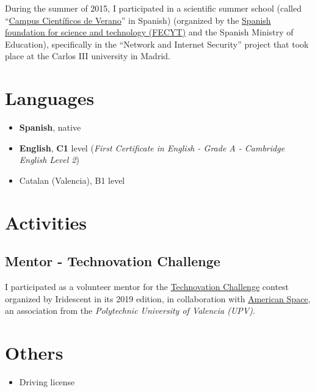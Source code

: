 \documentclass[letterpaper, 12pt, dvipsnames]{article}
\newcommand{\uni}{{\uniFull} ({\uniShort})}
\newcommand{\uniFull}{Polytechnic University of Valencia}
\newcommand{\uniShort}{UPV}
\newcommand{\fce}{\emph{First Certificate in English - Grade A - Cambridge English Level 2}}
\begin{document}
During the summer of 2015, I participated in a scientific summer school (called ``\href{https://www.fecyt.es/en/tematica/campus-cientificos-de-verano}{Campus Científicos de Verano}'' in Spanish) (organized by the \href{https://www.fecyt.es/en}{Spanish foundation for science and technology (FECYT)} and the Spanish Ministry of Education), specifically in the ``Network and Internet Security'' project that took place at the Carlos III university in Madrid.

\section*{Languages}

\begin{itemize}
    \item \textbf{Spanish}, native
    \item \textbf{English}, \textbf{C1} level (\fce)
    \item Catalan (Valencia), B1 level
\end{itemize}

\section*{Activities}

\subsection*{Mentor - Technovation Challenge}

I participated as a volunteer mentor for the \href{https://technovationchallenge.org/}{Technovation Challenge} contest organized by Iridescent in its 2019 edition, in collaboration with \href{https://cdl.upv.es/american-space}{American Space}, an association from the \emph{\uni}.

\section*{Others}

\begin{itemize}
    \item Driving license
\end{itemize}
\end{document}
